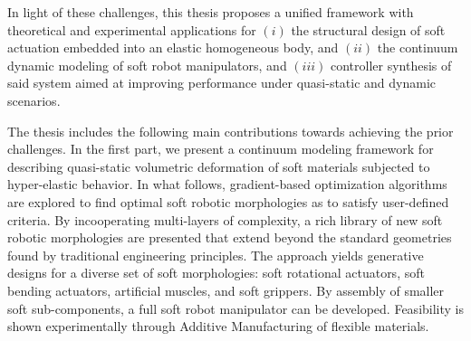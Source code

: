 \par In light of these challenges, this thesis proposes a unified framework with theoretical and experimental applications for $(i)$ the structural design of soft actuation embedded into an elastic homogeneous body, and $(ii)$ the continuum dynamic modeling of soft robot manipulators, and $(iii)$ controller synthesis of said system aimed at improving performance under quasi-static and dynamic scenarios.

\par The thesis includes the following main contributions towards achieving the prior challenges. In the first part, we present a continuum modeling framework for describing quasi-static volumetric deformation of soft materials subjected to hyper-elastic behavior. In what follows, gradient-based optimization algorithms are explored to find optimal soft robotic morphologies as to satisfy user-defined criteria. By incooperating multi-layers of complexity, a rich library of new soft robotic morphologies are presented that extend beyond the standard geometries found by traditional engineering principles. The approach yields generative designs for a diverse set of soft morphologies: soft rotational actuators, soft bending actuators, artificial muscles, and soft grippers. By assembly of smaller soft sub-components, a full soft robot manipulator can be developed. Feasibility is shown experimentally through Additive Manufacturing of flexible materials.




